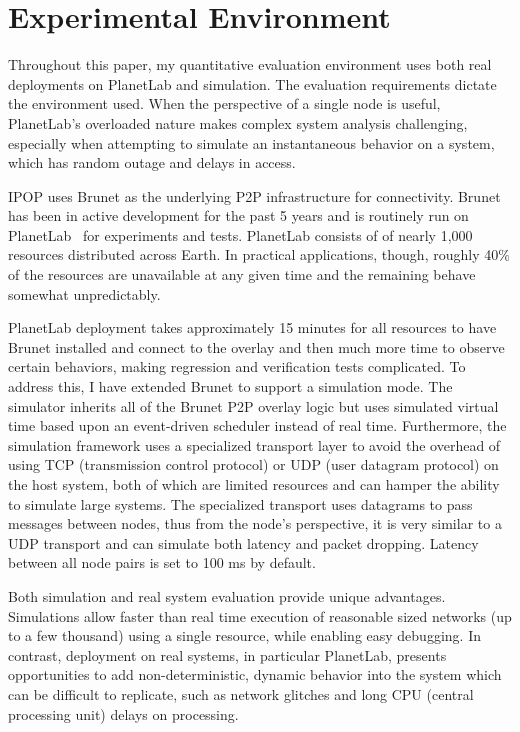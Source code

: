 \section{Experimental Environment}
\label{vpn:experimental}

Throughout this paper, my quantitative evaluation environment uses both real
deployments on PlanetLab and simulation.  The evaluation requirements dictate
the environment used.  When the perspective of a single node is useful,
PlanetLab's overloaded nature makes complex system analysis challenging,
especially when attempting to simulate an instantaneous behavior on a system,
which has random outage and delays in access.

IPOP uses Brunet as the underlying P2P infrastructure for connectivity.  Brunet
has been in active development for the past 5 years and is routinely run on
PlanetLab~\cite{planetlab} for experiments and tests.  PlanetLab consists of of
nearly 1,000 resources distributed across Earth.  In practical applications,
though, roughly 40\% of the resources are unavailable at any given time and the
remaining behave somewhat unpredictably.

PlanetLab deployment takes approximately 15 minutes for all resources to have
Brunet installed and connect to the overlay and then much more time to observe
certain behaviors, making regression and verification tests complicated.  To
address this, I have extended Brunet to support a simulation mode. The
simulator inherits all of the Brunet P2P overlay logic but uses simulated
virtual time based upon an event-driven scheduler instead of real time.
Furthermore, the simulation framework uses a specialized transport layer to
avoid the overhead of using TCP (transmission control protocol) or UDP (user
datagram protocol) on the host system, both of which are limited resources and
can hamper the ability to simulate large systems.   The specialized transport
uses datagrams to pass messages between nodes, thus from the node's
perspective, it is very similar to a UDP transport and can simulate both
latency and packet dropping.  Latency between all node pairs is set to 100 ms
by default.

Both simulation and real system evaluation provide unique advantages.
Simulations allow faster than real time execution of reasonable sized networks
(up to a few thousand) using a single resource, while enabling easy debugging.
In contrast, deployment on real systems, in particular PlanetLab, presents
opportunities to add non-deterministic, dynamic behavior into the system which
can be difficult to replicate, such as network glitches and long CPU (central
processing unit) delays on processing.

